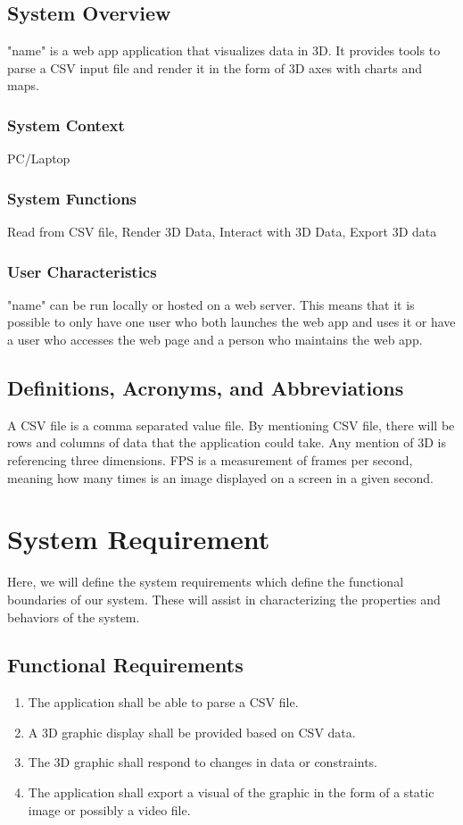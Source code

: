 \documentclass[letterpaper,10pt,titlepage, onecolumn, draftclsnofoot]{IEEEtran}
\begin{document}
    \subsection{System Overview}
    \noindent "name" is a web app application that visualizes data in 3D. It provides tools to parse a CSV input file and render it in the form of 3D axes with charts and maps.
        \subsubsection{System Context}
        PC/Laptop
        \subsubsection{System Functions}
        Read from CSV file, Render 3D Data, Interact with 3D Data, Export 3D data
        \subsubsection{User Characteristics}
        "name" can be run locally or hosted on a web server. This means that it is possible to only have one user who both launches the web app and uses it or have a user who accesses the web page and a person who maintains the web app.

    \subsection{Definitions, Acronyms, and Abbreviations}
    \noindent A CSV file is a comma separated value file. By mentioning CSV file, there will be rows and columns of data that the application could take. Any mention of 3D is referencing three dimensions. FPS is a measurement of frames per second, meaning how many times is an image displayed on a screen in a given second.

\section{System Requirement}
\noindent Here, we will define the system requirements which define the functional boundaries of our system. These will assist in characterizing the properties and behaviors of the system.

    \subsection{Functional Requirements}
    \begin{enumerate}
        \item The application shall be able to parse a CSV file.
        \item A 3D graphic display shall be provided based on CSV data.
        \item The 3D graphic shall respond to changes in data or constraints.
        \item The application shall export a visual of the graphic in the form of a static image or possibly a video file.
    \end{enumerate}
    
\end{document}
